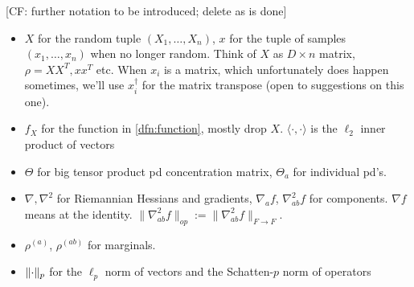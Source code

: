 \documentclass{article}
\DeclarePairedDelimiter{\norm}{\lVert}{\rVert}
\renewcommand{\vec}{\bm}
\newcommand\SL{\operatorname{SL}}
\newcommand\PD{\operatorname{P}}
\newcommand\Sym{\mathcal{S}}
\newcommand\smallSym{S}
\newcommand\SPD{\mathcal{P}}
\newcommand\samp{x}
\newcommand\rv{X}
\newcommand{\CF}[1]{{\color{purple}[CF: #1]}}
\newcommand{\MW}[1]{{\color{red}[MW: #1]}}
\begin{document}
\CF{further notation to be introduced; delete as is done}
\begin{itemize}

\item $\rv$ for the random tuple $(\rv_1, \dots, \rv_n)$, $x$ for the tuple of samples $(x_1, \dots, x_n)$ when no longer random. Think of $\rv$ as $D \times n$ matrix, $\rho = \rv\rv^T,xx^T$ etc. When $x_i$ is a matrix, which unfortunately does happen sometimes, we'll use $x_i^\dagger$ for the matrix transpose (open to suggestions on this one).
\item $f_{\rv}$ for the function in \cref{dfn:function}, mostly drop $\rv$. $\langle \cdot, \cdot \rangle$ is the $\ell_2$ inner product of vectors

\item $\Theta$ for big tensor product pd concentration matrix, $\Theta_a$ for individual pd's.

\item $\nabla, \nabla^2$ for Riemannian Hessians and gradients, $\nabla_a f$, $\nabla^2_{ab} f$ for components. $\nabla f$ means at the identity. $\|\nabla^2_{ab}f\|_{op}:=\|\nabla^2_{ab}f\|_{F\to F}$.
\item $\rho^{(a)}$, $\rho^{(ab)}$ for marginals.
\item $\norm{\cdot}_p$ for the $\ell_p$ norm of vectors and the Schatten-$p$ norm of operators
\end{itemize}
\end{document}
